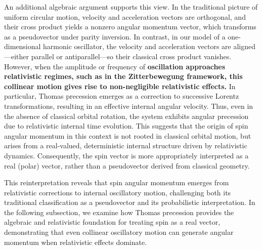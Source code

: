 \documentclass[%
 reprint,
 amsmath,amssymb,
 aps,
]{revtex4-1}
\numberwithin{equation}{section}%
\begin{document}
An additional algebraic argument supports this view. In the traditional picture of uniform circular motion, velocity and acceleration vectors are orthogonal, and their cross product yields a nonzero angular momentum vector, which transforms as a pseudovector under parity inversion. In contrast, in our model of a one-dimensional harmonic oscillator, the velocity and acceleration vectors are aligned—either parallel or antiparallel—so their classical cross product vanishes. However, when the amplitude or frequency of \textbf{oscillation approaches relativistic regimes, such as in the Zitterbewegung framework, this collinear motion gives rise to non-negligible relativistic effects.} In particular, Thomas precession emerges as a correction to successive Lorentz transformations, resulting in an effective internal angular velocity. Thus, even in the absence of classical orbital rotation, the system exhibits angular precession due to relativistic internal time evolution. This suggests that the origin of spin angular momentum in this context is not rooted in classical orbital motion, but arises from a real-valued, deterministic internal structure driven by relativistic dynamics. Consequently, the spin vector is more appropriately interpreted as a real (polar) vector, rather than a pseudovector derived from classical geometry.

\medskip

This reinterpretation reveals that spin angular momentum emerges from relativistic corrections to internal oscillatory motion, challenging both its traditional classification as a pseudovector and its probabilistic interpretation. In the following subsection, we examine how Thomas precession provides the algebraic and relativistic foundation for treating spin as a real vector, demonstrating that even collinear oscillatory motion can generate angular momentum when relativistic effects dominate.
\end{document}
